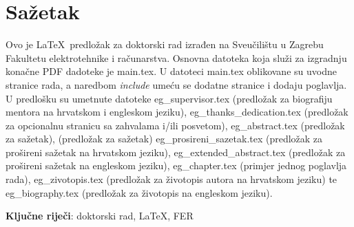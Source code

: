 \thispagestyle{empty}


\section*{Sažetak}


Ovo je \LaTeX\ predložak za doktorski rad izrađen na Sveučilištu u Zagrebu Fakultetu elektrotehnike i računarstva. Osnovna datoteka  koja služi za izgradnju konačne PDF dadoteke je main.tex. U datoteci main.tex oblikovane su uvodne stranice rada, a naredbom \textit{include} umeću se dodatne stranice i dodaju poglavlja. U predlošku su umetnute datoteke eg\_supervisor.tex (predložak za biografiju mentora na hrvatskom i engleskom jeziku), eg\_thanks\_dedication.tex (predložak za opcionalnu stranicu sa zahvalama i/ili posvetom), eg\_abstract.tex (predložak za sažetak), (predložak za sažetak) eg\_prosireni\_sazetak.tex (predložak za prošireni sažetak na hrvatskom jeziku), eg\_extended\_abstract.tex (predložak za prošireni sažetak na engleskom jeziku), eg\_chapter.tex (primjer jednog poglavlja rada), eg\_zivotopis.tex (predložak za životopis autora na hrvatskom jeziku) te eg\_biography.tex (predložak za životopis na engleskom jeziku).

\vspace{1cm}
\textbf{Ključne riječi}:  doktorski rad, \LaTeX, FER





